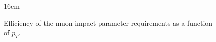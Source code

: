 \begin{figure}[hbtp]{16cm}
	\caption{Efficiency of the muon impact parameter requirements as a function of $p_{T}$.}
	\centering
	\quad

\end{figure}
